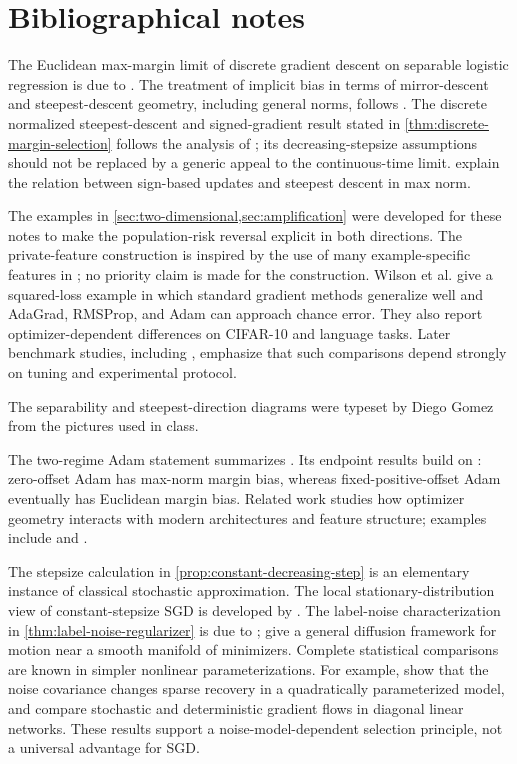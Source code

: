 \documentclass[11pt,twoside]{article}
\theoremstyle{definition}
\theoremstyle{remark}
\begin{document}
\clearpage
\printendnotes

\section*{Bibliographical notes}

The Euclidean max-margin limit of discrete gradient descent on separable
logistic regression is due to \citet{soudry2018}. The treatment of implicit
bias in terms of mirror-descent and steepest-descent geometry, including
general norms, follows \citet{gunasekar2018}. The discrete normalized
steepest-descent and signed-gradient result stated in
\cref{thm:discrete-margin-selection} follows the analysis of
\citet{fan2025spectral}; its decreasing-stepsize assumptions should not be
replaced by a generic appeal to the continuous-time limit. \citet{balles2018}
explain the relation between sign-based updates and steepest descent in max
norm.

The examples in \cref{sec:two-dimensional,sec:amplification} were developed
for these notes to make the population-risk reversal explicit in both
directions. The private-feature construction is inspired by the use of many
example-specific features in \citet{wilson2017}; no priority claim is made
for the construction. Wilson et al. give a squared-loss example in which
standard gradient methods generalize well and AdaGrad, RMSProp, and Adam can
approach chance error. They also report optimizer-dependent differences on
CIFAR-10 and language tasks. Later benchmark studies, including
\citet{sivaprasad2020}, emphasize that such comparisons depend strongly on
tuning and experimental protocol.

The separability and steepest-direction diagrams were typeset by Diego Gomez
from the pictures used in class.

The two-regime Adam statement summarizes \citet{fan2026}. Its endpoint
results build on
\citet{wang2022,zhang2024}: zero-offset Adam has max-norm margin bias, whereas
fixed-positive-offset Adam eventually has Euclidean margin bias. Related
work studies how optimizer geometry interacts with modern architectures and
feature structure; examples include \citet{schmidt2021,zhang2024transformers}
and \citet{vasudeva2025}.

The stepsize calculation in \cref{prop:constant-decreasing-step} is an
elementary instance of classical stochastic approximation. The local
stationary-distribution view of constant-stepsize SGD is developed by
\citet{mandt2017}. The label-noise characterization in
\cref{thm:label-noise-regularizer} is due to \citet{blanc2020};
\citet{li2022} give a general diffusion framework for motion near a smooth
manifold of minimizers. Complete statistical comparisons are known in simpler
nonlinear parameterizations. For example, \citet{haochen2021} show that the
noise covariance changes sparse recovery in a quadratically parameterized
model, and \citet{pesme2021} compare stochastic and deterministic gradient
flows in diagonal linear networks. These results support a
noise-model-dependent selection principle, not a universal advantage for
SGD.
\end{document}
